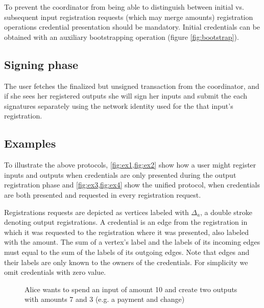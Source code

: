 \documentclass{article}
\begin{document}
To prevent the coordinator from being able to distinguish between initial vs. subsequent input registration requests (which may merge amounts) registration operations credential presentation should be mandatory. Initial credentials can be obtained with an auxiliary bootstrapping operation (figure \ref{fig:bootstrap}).

\subsection{Signing phase}

The user fetches the finalized but unsigned transaction from the coordinator, and if she sees her registered outputs she will sign her inputs and submit the each signatures separately using the network identity used for the that input's registration.

\subsection{Examples}

To illustrate the above protocols, \cref{fig:ex1,fig:ex2} show how a user might register inputs and outputs when credentials are only presented during the output registration phase and \cref{fig:ex3,fig:ex4} show the unified protocol, when credentials are both presented and requested in every registration request.

Registrations requests are depicted as vertices labeled with $\Delta_a$, a double stroke denoting output registrations. A credential is an edge from the registration in which it was requested to the registration where it was presented, also labeled with the amount. The sum of a vertex's label and the labels of its incoming edges must equal to the sum of the labels of its outgoing edges. Note that edges and their labels are only known to the owners of the credentials. For simplicity we omit credentials with zero value.

\begin{figure}[h!]
  \centering
  \caption{Alice wants to spend an input of amount 10 and create two outputs with amounts 7 and 3 (e.g. a payment and change)}
  \label{fig:ex1}
\end{figure}
\end{document}
